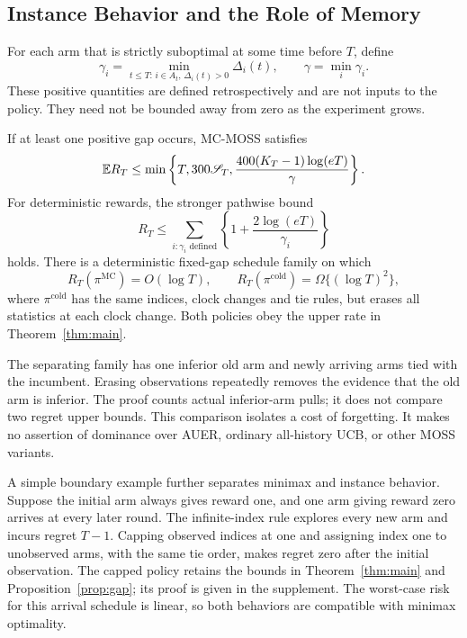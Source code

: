 \subsection{Instance Behavior and the Role of Memory}
For each arm that is strictly suboptimal at some time before $T$, define
\[
 \gamma_i=\min_{t\le T:\,i\in A_t,\,\Delta_i(t)>0}\Delta_i(t),
 \qquad \gamma=\min_i\gamma_i.
\]
These positive quantities are defined retrospectively and are not inputs to the policy. They need not be bounded away from zero as the experiment grows.

\begin{proposition}\label{prop:gap}
If at least one positive gap occurs, MC-MOSS satisfies
\begin{equation}\label{eq:gap-bound}
 \mathbb E R_T\le\min\left\{T,300\mathscr S_T,
 \frac{400(K_T-1)\log(eT)}{\gamma}\right\}.
\end{equation}
For deterministic rewards, the stronger pathwise bound
\begin{equation}\label{eq:det-gap}
 R_T\le\sum_{i:\gamma_i\text{ defined}}
 \left\{1+\frac{2\log(eT)}{\gamma_i}\right\}
\end{equation}
holds. There is a deterministic fixed-gap schedule family on which
\[
 R_T(\pi^{\mathrm{MC}})=O(\log T),\qquad
 R_T(\pi^{\mathrm{cold}})=\Omega\{(\log T)^2\},
\]
where $\pi^{\mathrm{cold}}$ has the same indices, clock changes and tie rules, but erases all statistics at each clock change. Both policies obey the upper rate in Theorem~\ref{thm:main}.
\end{proposition}

The separating family has one inferior old arm and newly arriving arms tied with the incumbent. Erasing observations repeatedly removes the evidence that the old arm is inferior. The proof counts actual inferior-arm pulls; it does not compare two regret upper bounds. This comparison isolates a cost of forgetting. It makes no assertion of dominance over AUER, ordinary all-history UCB, or other MOSS variants.

A simple boundary example further separates minimax and instance behavior. Suppose the initial arm always gives reward one, and one arm giving reward zero arrives at every later round. The infinite-index rule explores every new arm and incurs regret $T-1$. Capping observed indices at one and assigning index one to unobserved arms, with the same tie order, makes regret zero after the initial observation. The capped policy retains the bounds in Theorem~\ref{thm:main} and Proposition~\ref{prop:gap}; its proof is given in the supplement. The worst-case risk for this arrival schedule is linear, so both behaviors are compatible with minimax optimality.
